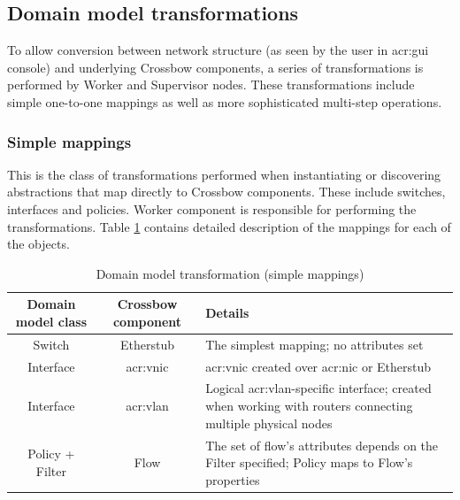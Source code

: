 \documentclass[11pt,openany]{book}
\begin{document}
      \subsection{Domain model transformations}
      \label{sec:impl:model}

        To allow conversion between network structure (as seen by the user in \gls{acr:gui} console) and underlying
        Crossbow components, a series of transformations is performed by Worker and Supervisor nodes. These
        transformations include simple one-to-one mappings as well as more sophisticated multi-step operations.


        \subsubsection{Simple mappings}

          This is the class of transformations performed when instantiating or discovering abstractions that map
          directly to Crossbow components. These include switches, interfaces and policies. Worker component is
          responsible for performing the transformations. Table \ref{tab:impl:simple-mapping} contains detailed
          description of the mappings for each of the objects.

          \begin{table}[H]
            \centering

            \begin{tabularx}{\textwidth}{|c|c|X|}
              \hline
              Domain model class & Crossbow component & \centering Details \tabularnewline
              \hline \hline
              Switch             & Etherstub          & The simplest mapping; no attributes set \\
              \hline
              Interface          & \gls{acr:vnic}     & \gls{acr:vnic} created over \gls{acr:nic} or Etherstub \\
              \hline
              Interface          & \gls{acr:vlan}     & Logical \gls{acr:vlan}-specific interface; created when working
                                                        with routers connecting multiple physical nodes \\
              \hline
              Policy + Filter    & Flow               & The set of flow's attributes depends on the Filter specified;
                                                        Policy maps to Flow's properties \\
              \hline
            \end{tabularx}

            \caption{Domain model transformation (simple mappings)}
            \label{tab:impl:simple-mapping}
          \end{table}
\end{document}
